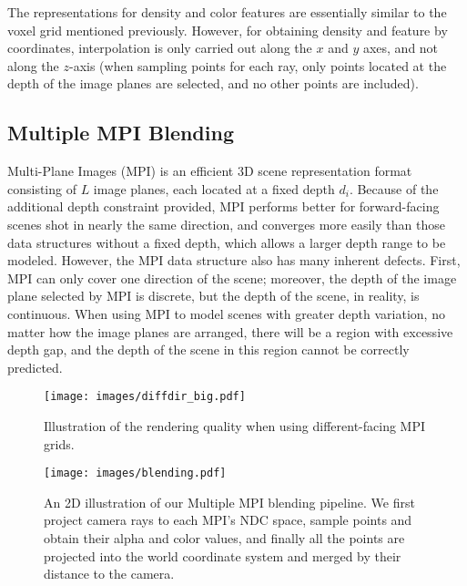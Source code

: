 \documentclass[letterpaper, 10 pt, conference]{ieeeconf}  %
\begin{document}
The representations for density and color features are essentially similar to the voxel grid mentioned previously. However, for obtaining density and feature by coordinates, interpolation is only carried out along the $x$ and $y$ axes, and not along the $z$-axis
(when sampling points for each ray, only points located at the depth of the image planes are selected, and no other points are included).


\subsection{Multiple MPI Blending}
\label{sec:blending}
Multi-Plane Images (MPI) is an efficient 3D scene representation format consisting of $L$ image planes, each located at a fixed depth $d_i$. Because of the additional depth constraint provided, MPI performs better for forward-facing scenes shot in nearly the same direction, and converges more easily than those data structures without a fixed depth, which allows a larger depth range to be modeled. However, the MPI data structure also has many inherent defects. First, MPI can only cover one direction of the scene; moreover, the depth of the image plane selected by MPI is discrete, but the depth of the scene, in reality, is continuous. When using MPI to model scenes with greater depth variation, no matter how the image planes are arranged, there will be a region with %
excessive
depth gap, and the depth of the scene in this region cannot be correctly predicted.

\begin{figure}[th]
  \centering
  \texttt{[image: images/diffdir\_big.pdf]}
  \caption{Illustration of the rendering quality when using different-facing MPI grids.}
  \label{fig:diffdir}
\end{figure}

\begin{figure}[th]
  \centering
  \texttt{[image: images/blending.pdf]}
  \caption{An 2D illustration of our Multiple MPI blending pipeline. We first project camera rays to each MPI's NDC space, sample points and obtain their alpha and color values, and finally all the points are projected into the world coordinate system and merged by their distance to the camera.}
  \label{fig:blending}
\end{figure}
\end{document}
